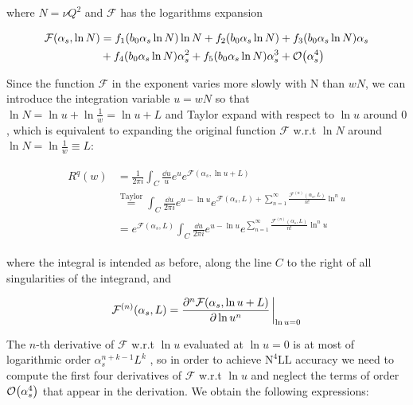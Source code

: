 \documentclass[../main.tex]{subfiles}
\begin{document}
where $N=\nu Q^2$ and $\mathcal{F}$ has the logarithms expansion

\begin{align}
    \begin{split}
    \mathcal{F}(\alpha_s,\ln N) &= f_1(b_0 \alpha_s \ln N) \ln N + f_2(b_0 \alpha_s \ln N) + f_3(b_0 \alpha_s \ln N) \alpha_s \\
    &+ f_4(b_0 \alpha_s \ln N) \alpha_s^2 + f_5(b_0 \alpha_s \ln N) \alpha_s^3 + \order{\alpha_s^4}
\end{split}
\end{align}

Since the function $\mathcal{F}$ in the exponent varies more slowly with N than $wN$, we can introduce the integration variable $u=wN$
so that $\ln N = \ln u +\ln \frac{1}{w} = \ln u + L$ and Taylor expand with respect to $\ln u$ around $0$, which is equivalent to expanding 
the original function $\mathcal{F}$ w.r.t $\ln N$ around $\ln N = \ln \frac{1}{w}\equiv L$:

\begin{align}
    \begin{split}\label{eq:Rw expansion}
       R^q(w) &= \frac{1}{2\pi i} \int_C \frac{\dd u}{u} e^{u} e^{\mathcal{F}(\alpha_s,\ln u + L)} \\
       &\stackrel{\text{Taylor}}{=} \int_C \frac{\dd u}{2\pi i} e^{u-\ln u} e^{\mathcal{F}(\alpha_s,L)+\sum_{n=1}^\infty \frac{\mathcal{F}^{(n)}(\alpha_s,L)}{n!}  \ln^n u}\\
       &= e^{\mathcal{F}(\alpha_s,L)} \int_C \frac{\dd u}{2\pi i} e^{u-\ln u} e^{\sum_{n=1}^\infty \frac{\mathcal{F}^{(n)}(\alpha_s,L)}{n!}  \ln^n u}
    \end{split}
\end{align}

where the integral is intended as before, along the line $C$ to the right of all singularities of the integrand, and 

\begin{equation}
    \mathcal{F}^{(n)}(\alpha_s,L) = \pdv[n]{\mathcal{F}(\alpha_s,\ln u + L )}{\ln u} \eval_{\ln u = 0}
\end{equation}

The $n$-th derivative of $\mathcal{F}$ w.r.t $\ln u$ evaluated at $\ln u = 0$ is 
at most of logarithmic order $\alpha_s^{n+k-1}L^k$ \cite{CATANI19933}, so in order to achieve $\text{N}^4\text{LL}$ accuracy we need to compute the first four derivatives of $\mathcal{F}$ w.r.t $\ln u$ and 
neglect the terms of order $\order{\alpha_s^4}$ that appear in the derivation. We obtain the following expressions: 
\end{document}
